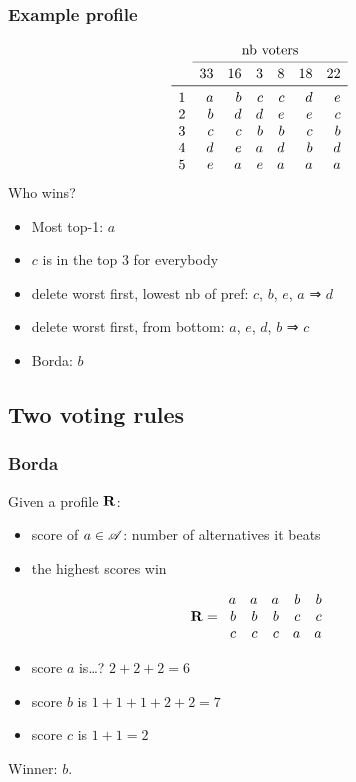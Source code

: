 \documentclass[french,english]{beamer}
\begin{document}
\begin{frame}[fragile]
	\frametitle{Example profile}
	\begin{equation}
		\begin{array}{lrrrrrr}
			&\multicolumn{6}{c}{\text{nb voters}}\\
		\cmidrule{2-7}
				&33	&16	&3	&8	&18	&22	\\
		\midrule
			1	&a	&b	&c	&c	&d	&e	\\
			2	&b	&d	&d	&e	&e	&c	\\
			3	&c	&c	&b	&b	&c	&b	\\
			4	&d	&e	&a	&d	&b	&d	\\
			5	&e	&a	&e	&a	&a	&a	\\
		\end{array}
	\end{equation}
	Who wins?\pause
	\begin{itemize}
		\item Most top-1: $a$
		\item $c$ is in the top 3 for everybody
		\item delete worst first, lowest nb of pref: $c$, $b$, $e$, $a$ ⇒ $d$
		\item delete worst first, from bottom: $a$, $e$, $d$, $b$ ⇒ $c$
		\item Borda: $b$
	\end{itemize}
\end{frame}

\subsection{Two voting rules}
\begin{frame}
	\frametitle{Borda}
	Given a profile $\mathbf{R}$:
	\begin{itemize}
		\item score of $a \in \mathscr{A}$: number of alternatives it beats
		\item the highest scores win
	\end{itemize}
	
	\begin{equation}
		\mathbf{R} =
		\begin{array}{rrrrr}
			a	&	a	&	a	&	b	&	b\\
			b	&	b	&	b	&	c	&	c\\
			c	&	c	&	c	&	a	&	a
		\end{array}
	\end{equation}
	\begin{itemize}
		\item score $a$ is\dots? \pause $2 + 2 + 2 = 6$
		\item score $b$ is $1 + 1 + 1 + 2 + 2 = 7$
		\item score $c$ is $1 + 1 = 2$
	\end{itemize}
	Winner: $b$.
\end{frame}
\end{document}
